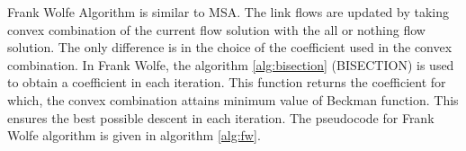 Frank Wolfe Algorithm is similar to MSA. The link flows are
updated by taking convex combination of the current flow solution
with the all or nothing flow solution. The only difference is
in the choice of the coefficient used in the convex combination.
In Frank Wolfe, the algorithm \ref{alg:bisection} (BISECTION) is
used to obtain a coefficient in each iteration. This function returns
the coefficient for which, the convex combination attains minimum
value of Beckman function. This ensures the best possible descent
in each iteration. The pseudocode for Frank Wolfe algorithm is given
in algorithm \ref{alg:fw}.



